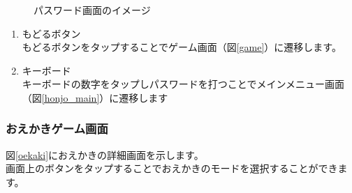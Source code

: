 \documentclass[a4j]{jarticle}
\begin{document}
\begin{figure}[H]
    \begin{center}
    \caption {パスワード画面のイメージ}
    \label{password}
    \end{center}
\end{figure}

\begin{enumerate}
  \renewcommand{\labelenumi}{\textcircled{\scriptsize \theenumi}}
\item もどるボタン\\
  もどるボタンをタップすることでゲーム画面（図\ref{game}）に遷移します。
\item キーボード\\
  キーボードの数字をタップしパスワードを打つことでメインメニュー画面（図\ref{honjo_main}）に遷移します
\end{enumerate}

\newpage
\subsubsection{おえかきゲーム画面}
図\ref{oekaki}におえかきの詳細画面を示します。\\
画面上のボタンをタップすることでおえかきのモードを選択することができます。\\
\end{document}
